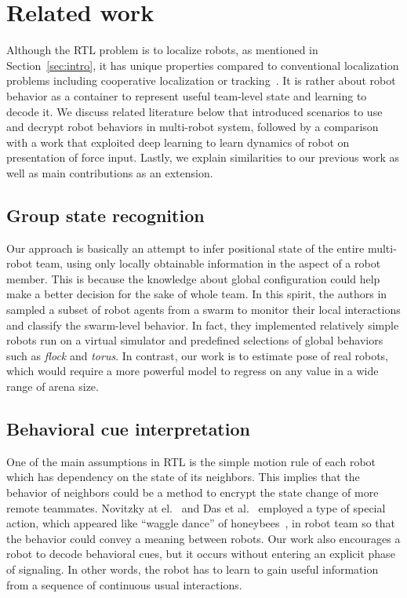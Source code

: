\documentclass[letterpaper, 10 pt, conference]{ieeeconf}  %
\begin{document}
	\section{Related work}
	\label{sec:related_work}

	Although the RTL problem is to localize robots, as mentioned in
	Section~\ref{sec:intro}, it has unique properties compared to conventional
    localization problems including	cooperative localization or
    tracking~\cite{LSRB16, FSDO10, CX14, DMG15}.
	It is rather about robot behavior as a container to
	represent useful team-level state and learning to decode it.
	We discuss related literature below that introduced scenarios to use and decrypt
	robot behaviors in multi-robot system, followed by a comparison with a work
	that exploited deep learning to learn dynamics of robot on presentation
	of force input.
	Lastly, we explain similarities to our previous work as well as main
	contributions as an extension.

	\subsection{Group state recognition}
	\label{sec:group_state_recognition}
	Our approach is basically an attempt to infer positional state of the entire
	multi-robot team, using only locally obtainable information in the aspect of a robot
	member. This is because the knowledge about global configuration could
	help make a better decision for the sake of whole team. In this spirit,
	the authors in~\cite{BG14, BSB16} sampled a subset of robot agents from a swarm to
	monitor their local interactions and classify the swarm-level behavior.
	In fact, they implemented relatively simple robots run on a virtual simulator and
	predefined selections of global behaviors such as \emph{flock} and \emph{torus}.
	In contrast, our work is to estimate pose of real robots, which would require a more
	powerful model to regress on any value in a wide range of arena size.

	\subsection{Behavioral cue interpretation}
	\label{sec:behavioral_cue_interpretation}

	One of the main assumptions in RTL is the simple motion rule of each robot which
	has dependency on the state of its neighbors. This implies that the behavior of
	neighbors could be a method to encrypt the state change of more remote teammates.
    Novitzky at el.~\cite{NPCBW12} and Das et al.~\cite{DCV16} employed a type of
    special action, which appeared like ``waggle dance'' of honeybees~\cite{VonFrisch67},
	in robot team so that the behavior could convey a meaning between robots.
	Our work also encourages a robot to decode behavioral cues, but it occurs without
	entering an explicit phase of signaling. In other words, the robot has to learn
	to gain useful information from a sequence of continuous usual interactions.
\end{document}
